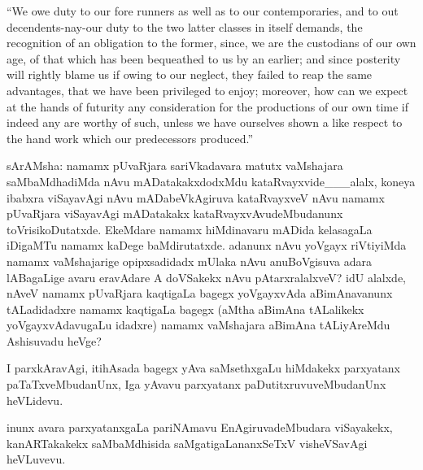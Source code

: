 \documentclass[11pt,a4size]{article}
\begin{document}
{
\rm
``We owe duty to our fore runners as well as to our contemporaries,
and to out decendents-nay-our duty to the two latter classes in itself
demands, the recognition of an obligation to the former, since, we are
the custodians of our own age, of that which has been bequeathed to us
by an earlier; and since posterity will rightly blame us if owing to
our neglect, they failed to reap the same advantages, that we have
been privileged to enjoy; moreover, how can we expect at the hands of
futurity any consideration for the productions of our own time if
indeed any are worthy of such, unless we have ourselves shown a like
respect to the hand work which our predecessors produced.''}

sArAMsha: namamx pUvaRjara sariVkadavara matutx vaMshajara
saMbaMdhadiMda nAvu mADatakakxdodxMdu kataRvayxvide\_\_\_alalx, koneya
ibabxra viSayavAgi nAvu mADabeVkAgiruva kataRvayxveV nAvu namamx
pUvaRjara viSayavAgi mADatakakx kataRvayxvAvudeMbudanunx
toVrisikoDutatxde. EkeMdare namamx hiMdinavaru mADida kelasagaLa
iDigaMTu namamx kaDege baMdirutatxde. adanunx nAvu yoVgayx riVtiyiMda
namamx vaMshajarige opipxsadidadx mUlaka nAvu anuBoVgisuva adara
lABagaLige avaru eravAdare A doVSakekx nAvu pAtarxralalxveV? idU
alalxde, nAveV namamx pUvaRjara kaqtigaLa bagegx yoVgayxvAda
aBimAnavanunx tALadidadxre namamx kaqtigaLa bagegx (aMtha aBimAna
tALalikekx yoVgayxvAdavugaLu idadxre) namamx vaMshajara aBimAna
tALiyAreMdu Ashisuvadu heVge?

I parxkAravAgi, itihAsada bagegx yAva saMsethxgaLu hiMdakekx
parxyatanx paTaTxveMbudanUnx, Iga yAvavu parxyatanx
paDutitxruvuveMbudanUnx heVLidevu.

inunx avara parxyatanxgaLa pariNAmavu EnAgiruvadeMbudara viSayakekx,
kanARTakakekx saMbaMdhisida saMgatigaLananxSeTxV visheVSavAgi
heVLuvevu.
\end{document}
